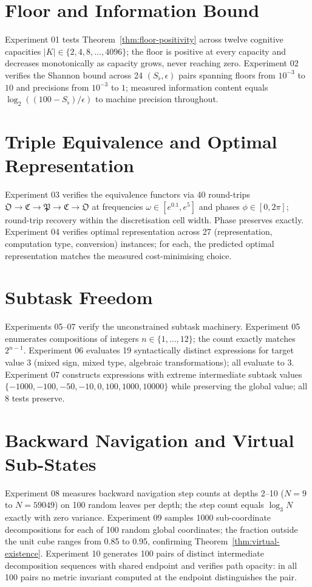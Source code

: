 \documentclass[twocolumn,a4paper]{article}
\newcommand{\Sfloor}{S_{\flat}}
\newcommand{\OOsc}{\mathfrak{O}}
\newcommand{\CCat}{\mathfrak{C}}
\newcommand{\PPart}{\mathfrak{P}}
\begin{document}
\section{Floor and Information Bound}

Experiment 01 tests Theorem~\ref{thm:floor-positivity} across twelve cognitive capacities $|K|\in\{2,4,8,\ldots,4096\}$; the floor is positive at every capacity and decreases monotonically as capacity grows, never reaching zero. Experiment 02 verifies the Shannon bound across 24 $(\Sfloor,\epsilon)$ pairs spanning floors from $10^{-3}$ to $10$ and precisions from $10^{-3}$ to $1$; measured information content equals $\log_{2}((100-\Sfloor)/\epsilon)$ to machine precision throughout.

\section{Triple Equivalence and Optimal Representation}

Experiment 03 verifies the equivalence functors via 40 round-trips $\OOsc\to\CCat\to\PPart\to\CCat\to\OOsc$ at frequencies $\omega\in[e^{0.1},e^{5}]$ and phases $\phi\in[0,2\pi]$; round-trip recovery within the discretisation cell width. Phase preserves exactly. Experiment 04 verifies optimal representation across 27 (representation, computation type, conversion) instances; for each, the predicted optimal representation matches the measured cost-minimising choice.

\section{Subtask Freedom}

Experiments 05--07 verify the unconstrained subtask machinery. Experiment 05 enumerates compositions of integers $n\in\{1,\ldots,12\}$; the count exactly matches $2^{n-1}$. Experiment 06 evaluates 19 syntactically distinct expressions for target value $3$ (mixed sign, mixed type, algebraic transformations); all evaluate to $3$. Experiment 07 constructs expressions with extreme intermediate subtask values $\{-1000,-100,-50,-10,0,100,1000,10000\}$ while preserving the global value; all 8 tests preserve.

\section{Backward Navigation and Virtual Sub-States}

Experiment 08 measures backward navigation step counts at depths 2--10 ($N=9$ to $N=59049$) on 100 random leaves per depth; the step count equals $\log_{3}N$ exactly with zero variance. Experiment 09 samples 1000 sub-coordinate decompositions for each of 100 random global coordinates; the fraction outside the unit cube ranges from 0.85 to 0.95, confirming Theorem~\ref{thm:virtual-existence}. Experiment 10 generates 100 pairs of distinct intermediate decomposition sequences with shared endpoint and verifies path opacity: in all 100 pairs no metric invariant computed at the endpoint distinguishes the pair.
\end{document}
